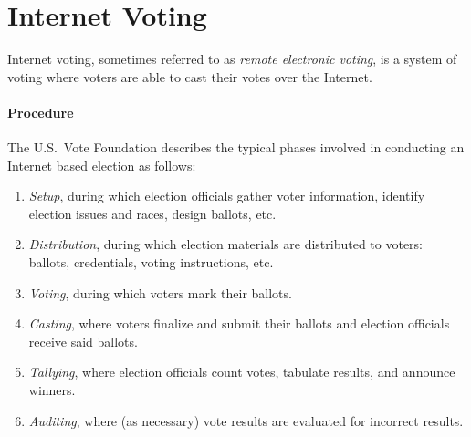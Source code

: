 \section{Internet Voting}\label{sec:internet-voting}
Internet voting, sometimes referred to as \emph{remote electronic voting}, is a
system of voting where voters are able to cast their votes over the Internet.

\paragraph{Procedure}
The U.S.\ Vote Foundation describes the typical phases involved in conducting an
Internet based election as follows:\cite{e2e-viv}

\begin{enumerate}
  \item \emph{Setup}, during which election officials gather voter information,
    identify election issues and races, design ballots, etc.

  \item \emph{Distribution}, during which election materials are distributed to
    voters: ballots, credentials, voting instructions, etc.

  \item \emph{Voting}, during which voters mark their ballots.

  \item \emph{Casting}, where voters finalize and submit their ballots and
    election officials receive said ballots.

  \item \emph{Tallying}, where election officials count votes, tabulate results,
    and announce winners.

  \item \emph{Auditing}, where (as necessary) vote results are evaluated for
    incorrect results.
\end{enumerate}

